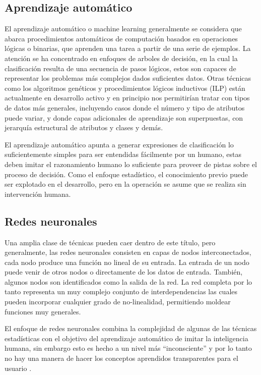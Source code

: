 \subsection{Aprendizaje automático}
El aprendizaje automático o machine learning generalmente se considera que abarca procedimientos automáticos de computación basados en operaciones lógicas o binarias, que aprenden una tarea a partir de una serie de ejemplos.
La atención se ha concentrado en enfoques de arboles de decisión, en la cual la clasificación resulta de una secuencia de pasos lógicos, estos son capaces de representar los problemas más complejos dados suficientes datos.
Otras técnicas como los algoritmos genéticos y procedimientos lógicos inductivos (ILP) están actualmente en desarrollo activo y en principio nos permitirían tratar con tipos de datos más generales, incluyendo casos donde el número y tipo de atributos puede variar, y donde capas adicionales de aprendizaje son superpuestas, con jerarquía estructural de atributos y clases y demás. 

El aprendizaje automático apunta a generar expresiones de clasificación lo suficientemente simples para ser entendidas fácilmente por un humano, estas deben imitar el razonamiento humano lo suficiente para proveer de pistas sobre el proceso de decisión. 
Como el enfoque estadístico, el conocimiento previo puede ser explotado en el desarrollo, pero en la operación se asume que se realiza sin intervención humana.

\subsection{Redes neuronales}
Una amplia clase de técnicas pueden caer dentro de este título, pero generalmente, las redes neuronales consisten en capas de nodos interconectados, cada nodo produce una función no lineal de su entrada. La entrada de un nodo puede venir de otros nodos o directamente de los datos de entrada. También, algunos nodos son identificados como la salida de la red. La red completa por lo tanto representa un muy complejo conjunto de interdependencias las cuales pueden incorporar cualquier grado de no-linealidad, permitiendo moldear funciones muy generales.

El enfoque de redes neuronales combina la complejidad de algunas de las técnicas estadísticas con el objetivo del aprendizaje automático de imitar la inteligencia humana, sin embargo esto es hecho a un nivel más ``inconsciente'' y por lo tanto no hay una manera de hacer los conceptos aprendidos transparentes para el usuario \cite{Michie94machinelearning}.

